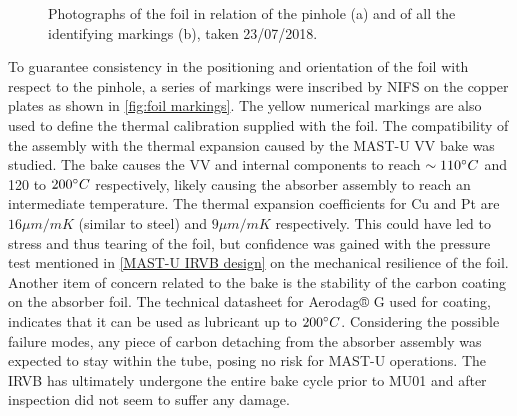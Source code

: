 \begin{figure}
\begin{subfigure}{0.63
     \linewidth}
         \label{fig:foil markings2}
     \end{subfigure}
    \caption{Photographs of the foil in relation of the pinhole (a) and of all the identifying markings (b), taken 23/07/2018.}
    \label{fig:foil markings}
\end{figure}

To guarantee consistency in the positioning and orientation of the foil with respect to the pinhole, a series of markings were inscribed by NIFS on the copper plates as shown in \autoref{fig:foil markings}. The yellow numerical markings are also used to define the thermal calibration supplied with the foil.
The compatibility of the assembly with the thermal expansion caused by the MAST-U VV bake was studied. The bake causes the VV and internal components to reach $\sim110\degree C$ and 120 to $200\degree C$ respectively, likely causing the absorber assembly to reach an intermediate temperature. The thermal expansion coefficients for Cu and Pt are $16 \mu m/mK$ (similar to steel) and $9 \mu m/mK$ respectively. This could have led to stress and thus tearing of the foil, but confidence was gained with the pressure test mentioned in \autoref{MAST-U IRVB design} on the mechanical resilience of the foil. Another item of concern related to the bake is the stability of the carbon coating on the absorber foil. The technical datasheet for Aerodag® G used for coating, indicates that it can be used as lubricant up to $200 \degree C$. Considering the possible failure modes, any piece of carbon detaching from the absorber assembly was expected to stay within the tube, posing no risk for MAST-U operations. The IRVB has ultimately undergone the entire bake cycle prior to MU01 and after inspection did not seem to suffer any damage.

